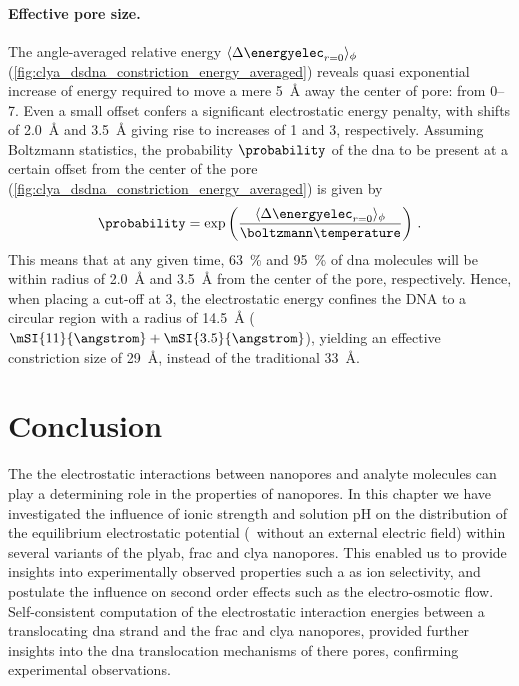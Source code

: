 \paragraph{Effective pore size.}
%
The angle-averaged relative energy $\langle \Delta \energyelec_{r=0} \rangle_{\phi}$
(\cref{fig:clya_dsdna_constriction_energy_averaged}) reveals quasi exponential increase of energy required to
move a mere \SI{5}{\angstrom} away the center of pore: from \SIrange{0}{7}{\kT}. Even a small offset confers a
significant electrostatic energy penalty, with shifts of \SI{2.0}{\angstrom} and \SI{3.5}{\angstrom} giving
rise to increases of \SI{1}{\kT} and \SI{3}{\kT}, respectively. Assuming Boltzmann statistics, the probability
$\probability$ of the \gls{dna} to be present at a certain offset from the center of the pore
(\cref{fig:clya_dsdna_constriction_energy_averaged}) is given by 
%
\begin{align}
  \probability = \exp{
    \left( \dfrac{\langle \Delta \energyelec_{r=0} \rangle_{\phi}}{\boltzmann\temperature} \right)
    }
    \text{  .}
\end{align}
%
This means that at any given time, \SI{63}{\percent} and \SI{95}{\percent} of \gls{dna} molecules will be
within radius of \SI{2.0}{\angstrom} and \SI{3.5}{\angstrom} from the center of the pore, respectively. Hence,
when placing a cut-off at \SI{3}{\kT}, the electrostatic energy confines the DNA to a circular region with a
radius of \SI{14.5}{\angstrom} ($\mSI{11}{\angstrom} + \mSI{3.5}{\angstrom}$), yielding an effective
constriction size of \SI{29}{\angstrom}, instead of the traditional \SI{33}{\angstrom}.


\section{Conclusion}
%
\label{sec:elec:conclusion}
%

The the electrostatic interactions between nanopores and analyte molecules can play a determining role in the
properties of nanopores. In this chapter we have investigated the influence of ionic strength and solution pH
on the distribution of the equilibrium electrostatic potential (\ie~without an external electric field) within
several variants of the \gls{plyab}, \gls{frac} and \gls{clya} nanopores. This enabled us to provide insights
into experimentally observed properties such a as ion selectivity, and postulate the influence on second order
effects such as the electro-osmotic flow. Self-consistent computation of the electrostatic interaction
energies between a translocating \gls{dna} strand and the \gls{frac} and \gls{clya} nanopores, provided
further insights into the \gls{dna} translocation mechanisms of there pores, confirming experimental
observations.

